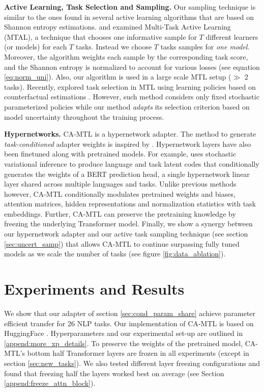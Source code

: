 \documentclass{article} \usepackage{iclr2021_conference,times}
\begin{document}
\textbf{Active Learning, Task Selection and Sampling.}
Our sampling technique is similar to the ones found in several active learning algorithms \citep{chen-etal-2006-empirical-study} that are based on Shannon entropy estimations. \citet{reichart2008multi} and \citet{ikhwantri2018multi} examined Multi-Task Active Learning (MTAL), a technique that chooses one informative sample for $T$ different learners (or models) for each $T$ tasks. Instead we choose $T$ tasks samples for \emph{one model}.
Moreover, the algorithm weights each sample by the corresponding task score, and the Shannon entropy is normalized to account for various losses (see equation \ref{eq:norm_uni}). Also, our algorithm is used in a large scale MTL setup ($\gg$ 2 tasks). Recently, \citet{DBLP:journals/corr/abs-1907-06214}  explored task selection in MTL using learning policies based on counterfactual estimations \citep{charles2013counterfactual}. However, such method considers only fixed stochastic parameterized policies while our method \emph{adapts} its selection criterion based on model uncertainty throughout the training process.

\textbf{Hypernetworks.}
CA-MTL is a hypernetwork adapter. The method to generate \emph{task-conditioned} adapter weights is inspired by \cite{Oswald2020Continual}. Hypernetwork layers have also been finetuned along with pretrained models. For example, \cite{ponti-etal-2021-parameter} uses stochastic variational inference \cite{JMLR:v14:hoffman13a} to produce language and task latent codes that conditionally generates the weights of a BERT prediction head, a single hypernetwork linear layer shared across multiple languages and tasks.  Unlike previous methods however, CA-MTL conditionally modulates pretrained weights and biases, attention matrices, hidden representations and normalization statistics with task embeddings. Further, CA-MTL can preserve the pretraining knowledge by freezing the underlying Transformer model. Finally, we show a synergy between our hypernetwork adapter and our active task sampling technique (see section \ref{sec:uncert_samp}) that allows CA-MTL to continue surpassing fully tuned models as we scale the number of tasks (see figure \ref{fig:data_ablation}).

\section{Experiments and Results}

We show that our adapter of section \ref{sec:cond_param_share} achieve parameter efficient transfer for 26 NLP tasks. 
Our implementation of CA-MTL is based on HuggingFace \citep{huggingface}. Hyperparameters and our experimental set-up are outlined in \ref{append:more_xp_details}. To preserve the weights of the pretrained model, CA-MTL's bottom half Transformer layers are frozen in all experiments (except in section \ref{sec:new_tasks}). We also tested different layer freezing configurations and found that freezing half the layers worked best on average (see Section \ref{append:freeze_attn_block}).
\end{document}
